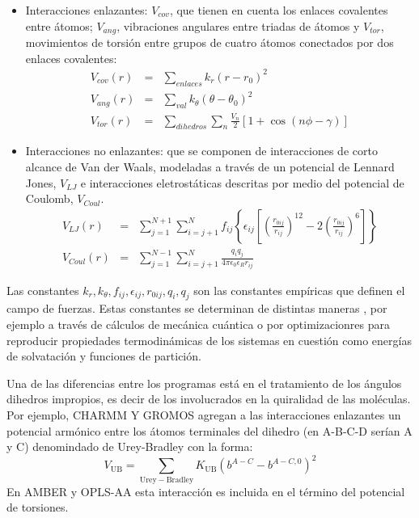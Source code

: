 \begin{itemize}
\item Interacciones enlazantes: $V_{cov}$, que tienen en cuenta los enlaces covalentes entre \'{a}tomos; $V_{ang}$, vibraciones angulares entre triadas de \'{a}tomos y $V_{tor}$, movimientos de torsi\'{o}n entre grupos de cuatro \'{a}tomos conectados por dos enlaces covalentes:
\begin{eqnarray}\label{eq:6}
V_{cov}(r)&=&\sum_{enlaces}k_r\left(r-r_0\right)^2\\
V_{ang}(r)&=&\sum_{val}k_\theta\left(\theta-\theta_{0}\right)^2\\
V_{tor}(r)&=&\sum_{dihedros}\sum_{n}\frac{V_n}{2}\left[1+\cos(n\phi-\gamma)\right]
\end{eqnarray}
\item Interacciones no enlazantes: que se componen de interacciones de corto alcance de Van der Waals, modeladas a trav\'{e}s de un potencial de Lennard Jones, $V_{LJ}$ e interacciones eletrost\'{a}ticas descritas por medio del potencial de Coulomb, $V_{Coul}$.
\begin{eqnarray}\label{eq:7}
V_{LJ}(r)&=&\sum_{j=1}^{N+1}\sum_{i=j+1}^N f_{ij}\left\{\epsilon_{ij}\left[\left(\frac{r_{0ij}}{r_{ij}}\right)^{12}-2\left(\frac{r_{0ij}}{r_{ij}}\right)^6\right]\right\}\\
V_{Coul}(r)&=&\sum_{j=1}^{N-1}\sum_{i=j+1}^{N}\frac{q_iq_j}{4\pi\epsilon_0\epsilon_R r_{ij}}
\end{eqnarray}
\end{itemize}
Las constantes $k_r,k_\theta,f_{ij},\epsilon_{ij},r_{0ij},q_{i},q_{j}$ son las constantes emp\'{i}ricas que definen el campo de fuerzas. Estas constantes se determinan de distintas maneras , por ejemplo a trav\'{e}s de c\'{a}lculos de mec\'{a}nica cu\'{a}ntica o por optimizacionres para reproducir propiedades termodin\'{a}micas de los sistemas en cuesti\'{o}n como energ\'{i}as de solvataci\'{o}n y funciones de partici\'{o}n.

Una de las diferencias entre los programas est\'{a} en el tratamiento de los \'{a}ngulos dihedros impropios, es decir de los involucrados en la quiralidad de las mol\'{e}culas. Por ejemplo, CHARMM Y GROMOS agregan a las interacciones enlazantes un potencial arm\'{o}nico entre los \'{a}tomos terminales del dihedro (en A-B-C-D ser\'{i}an A y C) denomindado de Urey-Bradley con la forma:
\begin{equation}\label{eq:8}
    V_{\mathrm{UB}}=\sum_{\mathrm{Urey-Bradley}} K_{\mathrm{UB}}(b^{A-C}-b^{A-C,0})^2
\end{equation}
En AMBER y OPLS-AA esta interacci\'{o}n es incluida en el t\'{e}rmino del potencial de torsiones.\\

